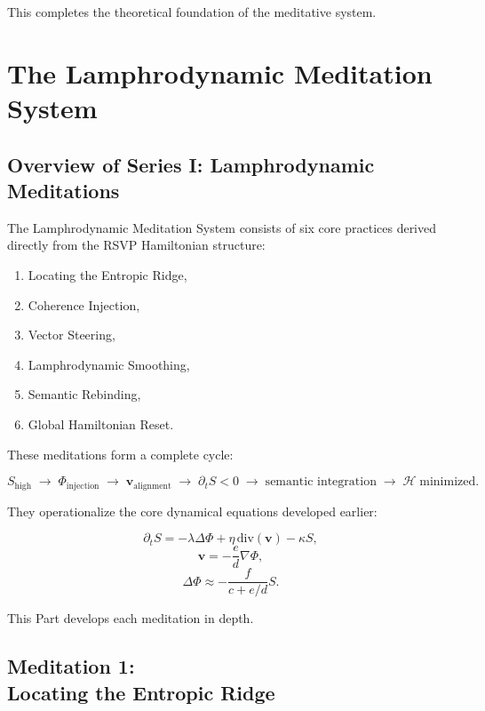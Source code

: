 \documentclass[12pt]{article}
\begin{document}
This completes the theoretical foundation of the meditative system.


\part{The Lamphrodynamic Meditation System}

\chapter{Overview of Series I: Lamphrodynamic Meditations}

The Lamphrodynamic Meditation System consists of six core practices derived
directly from the RSVP Hamiltonian structure:

\begin{enumerate}
    \item Locating the Entropic Ridge,
    \item Coherence Injection,
    \item Vector Steering,
    \item Lamphrodynamic Smoothing,
    \item Semantic Rebinding,
    \item Global Hamiltonian Reset.
\end{enumerate}

These meditations form a complete cycle:

\[
S_{\text{high}}
\;\longrightarrow\;
\Phi_{\text{injection}}
\;\longrightarrow\;
\mathbf{v}_{\text{alignment}}
\;\longrightarrow\;
\partial_t S < 0
\;\longrightarrow\;
\text{semantic integration}
\;\longrightarrow\;
\mathcal{H}\;\text{minimized}.
\]

They operationalize the core dynamical equations developed earlier:

\[
\partial_t S
= -\lambda \Delta\Phi + \eta\,\mathrm{div}(\mathbf{v}) - \kappa S,
\]
\[
\mathbf{v} = -\frac{e}{d}\nabla\Phi,
\]
\[
\Delta\Phi \approx -\frac{f}{c+e/d}S.
\]

This Part develops each meditation in depth.

\newpage

\chapter{Meditation 1:\\ Locating the Entropic Ridge}
\end{document}
